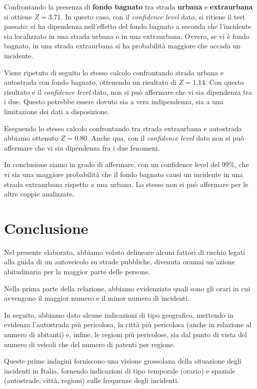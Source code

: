 \documentclass[12pt,a4paper,final,oneside]{article}			%
\begin{document}
        Confrontando la presenza di \textbf{fondo bagnato} tra strada \textbf{urbana} e \textbf{extraurbana} si ottiene $Z = 3.71$. In questo caso, con il \textit{confidence level} dato, si ritiene il test passato: si ha dipendenza nell'effetto del fondo bagnato a seconda che l'incidente sia localizzato in una strada urbana o in una extraurbana. Ovvero, se vi è fondo bagnato, in una strada extraurbana si ha probabilità maggiore che accada un incidente.
        
        Viene ripetuto di seguito lo stesso calcolo confrontando strada urbana e autostrada con fondo bagnato, ottenendo un risultato di $Z = 1.14$. Con questo risultato e il \textit{confidence level} dato, non si può affermare che vi sia dipendenza tra i due. Questo potrebbe essere dovuto sia a vera indipendenza, sia a una limitazione dei dati a disposizione.
        
        Eseguendo lo stesso calcolo confrontando tra strada extraurbana e autostrada abbiamo ottenuto $Z = 0.80$. Anche qua, con il \textit{confidence level} dato non si può affermare che vi sia dipendenza fra i due fenomeni.
        
        In conclusione siamo in grado di affermare, con un confidence level del 99\%, che vi sia una maggiore probabilità che il fondo bagnato causi un incidente in una strada extraurbana rispetto a una urbana. Lo stesso non si può affermare per le altre coppie analizzate.
        
\clearpage
\section{Conclusione}
    Nel presente elaborato, abbiamo voluto delineare alcuni fattori di rischio legati alla guida di un autoveicolo su strade pubbliche, divenuta oramai un’azione abitudinaria per la maggior parte delle persone.
    
    Nella prima parte della relazione, abbiamo evidenziato quali sono gli orari in cui avvengono il maggior numero e il minor numero di incidenti.
    
    In seguito, abbiamo dato alcune indicazioni di tipo geografico, mettendo in evidenza l’autostrada più pericolosa, la città più pericolosa (anche in relazione al numero di abitanti) e, infine, le regioni più pericolose, sia dal punto di vista del numero di veicoli che del numero di patenti per regione.
    
    Queste prime indagini forniscono una visione grossolana della situazione degli incidenti in Italia, fornendo indicazioni di tipo temporale (orario) e spaziale (autostrade, città, regioni) sulle frequenze degli incidenti.
    
\end{document}
